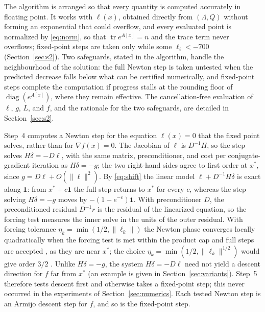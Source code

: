 \documentclass[11pt]{article}
\newcommand{\tr}{\operatorname{tr}}
\newcommand{\diag}{\operatorname{diag}}
\newcommand{\one}{\mathbf{1}}
\begin{document}
The algorithm is arranged so that every quantity is computed accurately
in floating point. It works with $\ell(x)$, obtained directly from
$(\Lambda,Q)$ without forming an exponential that could overflow, and
every evaluated point is normalized by \eqref{eq:norm}, so that
$\tr e^{A[x]}=n$ and the trace term never overflows; fixed-point
steps are taken only while some $\ell_i<-700$ (Section~\ref{sec:s2}).
Two safeguards, stated in the algorithm, handle the neighbourhood of
the solution: the full Newton step is taken untested when the
predicted decrease falls below what can be certified numerically, and
fixed-point steps complete the computation if progress stalls at the
rounding floor of $\diag(e^{A[x]})$, where they remain effective. The
cancellation-free evaluation of $\ell$, $g$, $L$, and $f$, and the
rationale for the two safeguards, are detailed in
Section~\ref{sec:s2}.

Step~4 computes a Newton step for the equation $\ell(x)=0$ that the
fixed point solves, rather than for $\nabla f(x)=0$. The Jacobian of
$\ell$ is $D^{-1}H$, so the step solves $H\delta=-D\ell$, with the
same matrix, preconditioner, and cost per conjugate-gradient iteration
as $H\delta=-g$; the two right-hand sides agree to first order at
$x^{\ast}$, since $g=D\ell+O(\|\ell\|^{2})$. By \eqref{eq:shift} the
linear model $\ell+D^{-1}H\delta$ is exact along $\one$: from
$x^{\ast}+c\one$ the full step returns to $x^{\ast}$ for every $c$,
whereas the step solving $H\delta=-g$ moves by $-(1-e^{-c})\one$. With
preconditioner $D$, the preconditioned residual $D^{-1}r$ is the
residual of the linearized equation, so the forcing test measures the
inner solve in the units of the outer residual. With forcing tolerance
$\eta_k=\min(1/2,\|\ell_k\|)$ the Newton phase converges locally
quadratically when the forcing test is met within the product cap and
full steps are accepted \citep{DemboEisenstatSteihaug:1982}, as they
are near $x^{\ast}$; the choice $\eta_k=\min(1/2,\|\ell_k\|^{1/2})$
would give order $3/2$ \citep{EisenstatWalker:1996}. Unlike
$H\delta=-g$, the system $H\delta=-D\ell$ need not yield a descent
direction for $f$ far from $x^{\ast}$ (an example is given in
Section~\ref{sec:variants}). Step~5 therefore tests descent first and
otherwise takes a fixed-point step; this never occurred in the
experiments of Section~\ref{sec:numerics}. Each tested Newton step is
an Armijo descent step for $f$, and so is the fixed-point step.
\end{document}
